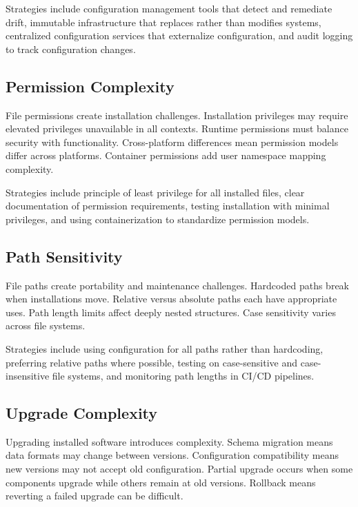 \documentclass[11pt]{article}
\begin{document}
Strategies include configuration management tools that detect and remediate drift, immutable infrastructure that replaces rather than modifies systems, centralized configuration services that externalize configuration, and audit logging to track configuration changes.

\subsection{Permission Complexity}

File permissions create installation challenges. Installation privileges may require elevated privileges unavailable in all contexts. Runtime permissions must balance security with functionality. Cross-platform differences mean permission models differ across platforms. Container permissions add user namespace mapping complexity.

Strategies include principle of least privilege for all installed files, clear documentation of permission requirements, testing installation with minimal privileges, and using containerization to standardize permission models.

\subsection{Path Sensitivity}

File paths create portability and maintenance challenges. Hardcoded paths break when installations move. Relative versus absolute paths each have appropriate uses. Path length limits affect deeply nested structures. Case sensitivity varies across file systems.

Strategies include using configuration for all paths rather than hardcoding, preferring relative paths where possible, testing on case-sensitive and case-insensitive file systems, and monitoring path lengths in CI/CD pipelines.

\subsection{Upgrade Complexity}

Upgrading installed software introduces complexity. Schema migration means data formats may change between versions. Configuration compatibility means new versions may not accept old configuration. Partial upgrade occurs when some components upgrade while others remain at old versions. Rollback means reverting a failed upgrade can be difficult.
\end{document}
